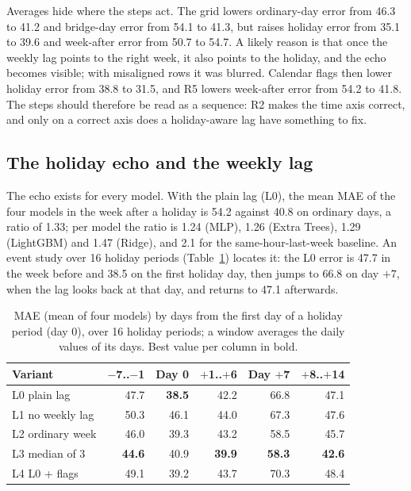 \documentclass[sigconf]{acmart}
\begin{document}
Averages hide where the steps act. The grid lowers ordinary-day error from 46.3 to 41.2 and bridge-day error from 54.1 to 41.3, but raises holiday error from 35.1 to 39.6 and week-after error from 50.7 to 54.7. A likely reason is that once the weekly lag points to the right week, it also points to the holiday, and the echo becomes visible; with misaligned rows it was blurred. Calendar flags then lower holiday error from 38.8 to 31.5, and R5 lowers week-after error from 54.2 to 41.8. The steps should therefore be read as a sequence: R2 makes the time axis correct, and only on a correct axis does a holiday-aware lag have something to fix.

\subsection{The holiday echo and the weekly lag}
The echo exists for every model. With the plain lag (L0), the mean MAE of the four models in the week after a holiday is 54.2 against 40.8 on ordinary days, a ratio of 1.33; per model the ratio is 1.24 (MLP), 1.26 (Extra Trees), 1.29 (LightGBM) and 1.47 (Ridge), and 2.1 for the same-hour-last-week baseline. An event study over 16 holiday periods (Table~\ref{tab:event}) locates it: the L0 error is 47.7 in the week before and 38.5 on the first holiday day, then jumps to 66.8 on day $+7$, when the lag looks back at that day, and returns to 47.1 afterwards.

\begin{table}[t]
  \caption{MAE (mean of four models) by days from the first day of a holiday period (day 0), over 16 holiday periods; a window averages the daily values of its days. Best value per column in bold.}
  \label{tab:event}
  \small
  \setlength{\tabcolsep}{3.5pt}
  \begin{tabular}{lrrrrr}
    \toprule
    Variant & $-$7..$-$1 & Day 0 & $+$1..$+$6 & Day $+$7 & $+$8..$+$14 \\
    \midrule
    L0 plain lag      & 47.7 & \textbf{38.5} & 42.2 & 66.8 & 47.1 \\
    L1 no weekly lag  & 50.3 & 46.1 & 44.0 & 67.3 & 47.6 \\
    L2 ordinary week  & 46.0 & 39.3 & 43.2 & 58.5 & 45.7 \\
    L3 median of 3    & \textbf{44.6} & 40.9 & \textbf{39.9} & \textbf{58.3} & \textbf{42.6} \\
    L4 L0 + flags     & 49.1 & 39.2 & 43.7 & 70.3 & 48.4 \\
    \bottomrule
  \end{tabular}
\end{table}
\end{document}
